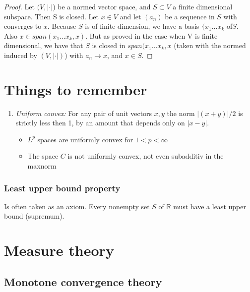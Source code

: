 \documentclass[titlepage]{article}
\begin{document}
\begin{proof}
Let $(V, |\cdot|$) be a normed vector space, and $S\subset V$ a finite dimensional subspace. Then S is closed.
Let $x\in V$ and let $(a_n)$ be a sequence in $S$ with converges to $x$. Because $S$ is of finite dimension, we have a basis $\{x_1...x_k$ of$S$. Also $x\in span(x_1...x_k,x)$. But as proved in the case when V is finite dimensional, we have that $S$ is closed in $span(x_1...x_k,x$ (taken with the normed induced by $(V, |\cdot|)$) with $a_n \rightarrow x$, and $x\in S$.
\end{proof}
\section{Things to remember}
\begin{enumerate}
\item \textit{Uniform convex:} For any pair of unit vectors $x,y$ the norm $|(x+y)|/2$ is strictly less then 1, by an amount that depends only on $|x-y|$.
   \begin{itemize}
        \item $L^p$ spaces are uniformly convex for $1<p<\infty$
        \item The space $C$ is not uniformly convex, not even subadditiv in the maxnorm
    \end{itemize}
\end{enumerate}

\subsubsection{Least upper bound property}
Is often taken as an axiom.
Every nonempty set $S$ of $\mathbb{R}$ must have a least upper bound (supremum).
\section{Measure theory}
\subsection*{Monotone convergence theory}
\end{document}
